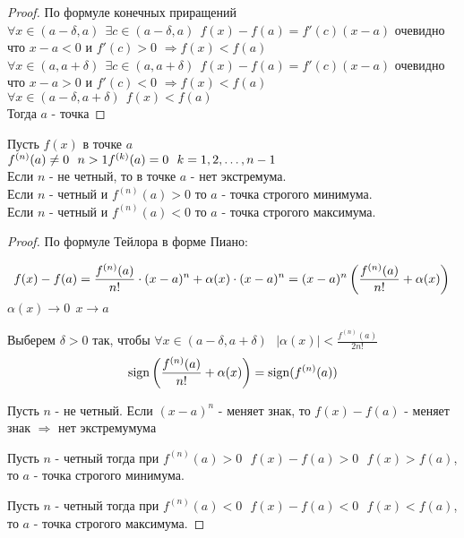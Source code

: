 \begin{proof}
  По формуле конечных приращений\\
  $\forall x \in (a - \delta, a) ~~ \exists c \in (a - \delta, a) ~~
  f(x) - f(a) = f'(c)(x - a)$ очевидно что
  $x - a < 0$ и $f'(c) > 0$ $\Rightarrow f(x) < f(a)$\\
  $\forall x \in (a, a + \delta) ~~ \exists c \in (a, a + \delta) ~~
  f(x) - f(a) = f'(c)(x - a)$ очевидно что
  $x - a > 0$ и $f'(c) < 0$ $\Rightarrow f(x) < f(a)$\\
  $\forall x \in (a - \delta, a + \delta) ~~ f(x) < f(a)$\\
  Тогда $a$ - точка 
\end{proof}

\begin{theorem}
  Пусть $f(x)$ в точке $a$\\
  $f^{(n)} (a) \neq 0 ~~ n > 1\\
  f^{(k)} (a) = 0 ~~ k = 1, 2, \ldots, n-1$\\
  Если $n$ - не четный, то в точке $a$ - нет экстремума.\\
  Если $n$ - четный и $f^{(n)} (a) > 0$ то $a$ - точка строгого минимума.\\
  Если $n$ - четный и $f^{(n)} (a) < 0$ то $a$ - точка строгого максимума.
\end{theorem}

\begin{proof}
  По формуле Тейлора в форме Пиано:

  $$
  f(x) - f(a) = \frac{f^{(n)}(a)}{n!} \cdot (x - a)^n + \alpha (x)
  \cdot (x - a)^n = (x - a)^n \left(\frac{f^{(n)}(a)}{n!} + \alpha(x) \right)\\
  $$
  $\alpha (x) \to 0 ~~ x \to a$

  Выберем $\delta > 0$ так, чтобы $\forall x \in
  (a - \delta, a + \delta) ~~~ |\alpha(x)| < \frac{f^{(n)}(a)}{2n!}$
  $$
  \mathrm{sign} \left(\frac{f^{(n)}(a)}{n!} + \alpha(x)\right) = \mathrm{sign} (f^{(n)}(a))
  $$

  Пусть $n$ - не четный. Если $(x - a)^n$ - меняет знак, то
  $f(x) - f(a)$ - меняет знак $\Rightarrow$ нет экстремумума

  Пусть $n$ - четный тогда при
  $f^{(n)}(a) > 0 ~~~ f(x) - f(a) > 0 ~~~ f(x) > f(a) $,
  то $a$ - точка строгого минимума.

  Пусть $n$ - четный тогда при
  $f^{(n)}(a) < 0 ~~~ f(x) - f(a) < 0 ~~~ f(x) < f(a) $,
  то $a$ - точка строгого максимума.
\end{proof}

